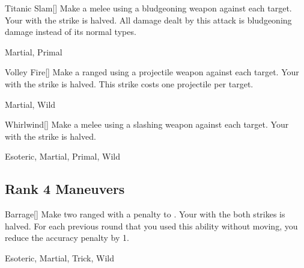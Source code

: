 \lowercase{\hypertarget{maneuver:Titanic Slam}{}}\label{maneuver:Titanic Slam}
\hypertarget{maneuver:Titanic Slam}{}
\begin{freeability}[Rank 3]{Titanic Slam}[]
Make a melee  using a bludgeoning weapon against each target.
Your  with the strike is halved.
All damage dealt by this attack is bludgeoning damage instead of its normal types.


 Martial, Primal
\end{freeability}
\vspace{0.25em}



\lowercase{\hypertarget{maneuver:Volley Fire}{}}\label{maneuver:Volley Fire}
\hypertarget{maneuver:Volley Fire}{}
\begin{freeability}[Rank 3]{Volley Fire}[]
Make a ranged  using a projectile weapon against each target.
Your  with the strike is halved.
This strike costs one projectile per target.


 Martial, Wild
\end{freeability}
\vspace{0.25em}



\lowercase{\hypertarget{maneuver:Whirlwind}{}}\label{maneuver:Whirlwind}
\hypertarget{maneuver:Whirlwind}{}
\begin{freeability}[Rank 3]{Whirlwind}[]
Make a melee  using a slashing weapon against each target.
Your  with the strike is halved.


 Esoteric, Martial, Primal, Wild
\end{freeability}
\vspace{0.25em}


\subsection{Rank 4 Maneuvers}

\lowercase{\hypertarget{maneuver:Barrage}{}}\label{maneuver:Barrage}
\hypertarget{maneuver:Barrage}{}
\begin{freeability}[Rank 4]{Barrage}[]
Make two ranged  with a  penalty to .
Your  with the both strikes is halved.
For each previous round that you used this ability without moving, you reduce the accuracy penalty by 1.


 Esoteric, Martial, Trick, Wild
\end{freeability}
\vspace{0.25em}



